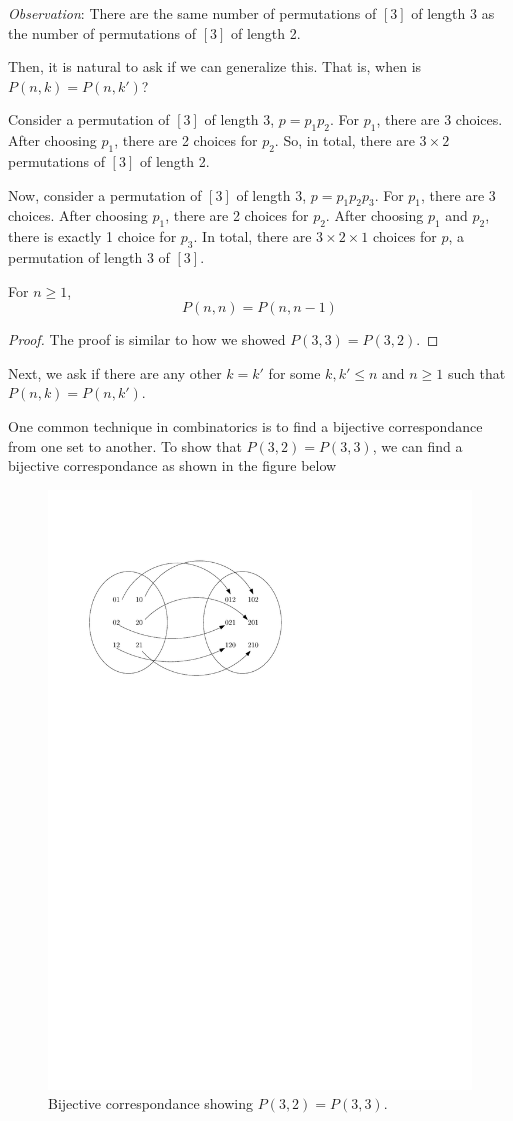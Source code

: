 \textit{Observation}: There are the same number of permutations of $[3]$ of length 3 as the number of permutations of $[3]$ of length 2.

Then, it is natural to ask if we can generalize this. That is, when is $P(n,k)=P(n,k')$?

Consider a permutation of $[3]$ of length 3, $p = p_1p_2$. For $p_1$, there are 3 choices. After choosing $p_1$, there are 2 choices for $p_2$. So, in total, there are $3 \times 2$ permutations of $[3]$ of length 2.

Now, consider a permutation of $[3]$ of length 3, $p = p_1p_2p_3$. For $p_1$, there are 3 choices. After choosing $p_1$, there are 2 choices for $p_2$. After choosing $p_1$ and $p_2$, there is exactly 1 choice for $p_3$. In total, there are $3 \times 2 \times 1$ choices for $p$, a permutation of length $3$ of $[3]$.

\begin{proposition}
   For $n \geq 1$,
   $$
   P(n,n) = P(n,n-1)
   $$
\end{proposition}
\begin{proof}
   The proof is similar to how we showed $P(3,3)=P(3,2)$.
\end{proof}

Next, we ask if there are any other $k=k'$ for some $k,k' \leq n$ and $n\geq 1$ such that $P(n,k) = P(n,k')$.

One common technique in combinatorics is to find a bijective correspondance from one set to another. To show that $P(3,2)=P(3,3)$, we can find a bijective correspondance as shown in the figure below

\begin{figure}[h]
   \centering
   \includegraphics[width=0.4\linewidth]{figures/biject-correspondance.pdf}
   \caption{Bijective correspondance showing $P(3,2)=P(3,3)$.}
\end{figure}

